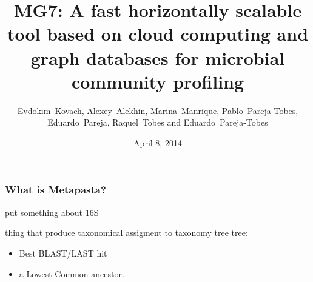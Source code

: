 \documentclass{beamer}
\title[MG7]{MG7: A fast horizontally scalable tool based on
cloud computing and graph databases for
microbial community profiling
} %
\author{Evdokim~Kovach, Alexey~Alekhin, Marina~Manrique, Pablo~Pareja-Tobes, Eduardo~Pareja, Raquel~Tobes and Eduardo~Pareja-Tobes} %
\institute[Era7] %
{
Oh no sequences! Research Group, Era7 bioinformatics
 \\ %
\textit{eparejatobes@ohnosequences.com} %
}
\date{April 8, 2014} %
\begin{document}
\begin{frame}
\titlepage %
\end{frame}



\begin{frame}
\frametitle{What is Metapasta?}
put something about 16S

thing that produce taxonomical assigment to taxonomy tree tree:

\begin{itemize}
  \item Best BLAST/LAST hit
  \item a Lowest Common ancestor.
\end{itemize}

\end{frame}
\end{document}
